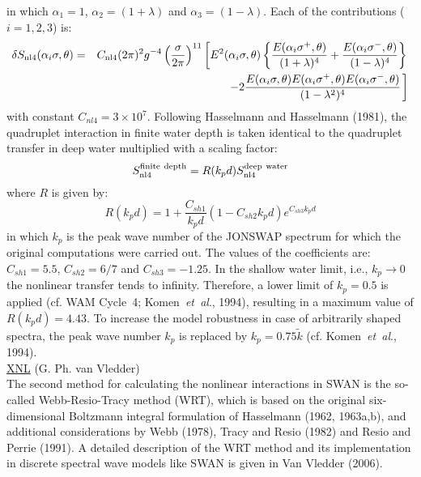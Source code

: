 \documentclass[12pt]{book}
\begin{document}
in which $\alpha_1 =1$, $\alpha_2 = (1+\lambda)$ and $\alpha_3 = (1-\lambda)$. Each of the contributions ($i=1,2,3$) is:
\begin{eqnarray}
  \delta S_{\rm nl4}(\alpha_i \sigma,\theta) &=& C_{\rm nl4} (2\pi)^2 g^{-4} \left(\frac{\sigma}{2\pi} \right)^{11}
  \left[E^2 (\alpha_i\sigma,\theta) \left\{\frac{E(\alpha_i\sigma^+,\theta)}{(1+\lambda)^4} +
  \frac{E(\alpha_i\sigma^{-},\theta)}{(1-\lambda)^4} \right\} \right. \nonumber \\
  &&\left. \left. -2\frac{E(\alpha_i\sigma,\theta) E(\alpha_i\sigma^+,\theta) E(\alpha_i\sigma^-,\theta)}{(1-\lambda^2)^4}
    \right. \right]
  \label{eq3-30}
\end{eqnarray}
with constant $C_{nl4} = 3 \times 10^7$. Following Hasselmann and Hasselmann (1981), the quadruplet interaction
in finite water depth is taken identical to the quadruplet transfer in deep water multiplied with a scaling
factor:
\begin{equation}
  S_{\rm nl4}^{\rm finite~depth} = R(k_pd)S_{\rm nl4}^{\rm deep~water}
  \label{eq3-31}
\end{equation}
where $R$ is given by:
\begin{equation}
  R(k_pd) = 1 + \frac{C_{sh1}}{k_pd} (1-C_{sh2}k_pd) e^{C_{sh3}k_pd}
  \label{eq3-32}
\end{equation}
in which $k_p$ is the peak wave number of the JONSWAP spectrum for which the original computations were
carried out. The values of the coefficients are: $C _{sh1}= 5.5$, $C _{sh2} = 6/7$ and $C _{sh3} = -1.25$.
In the shallow water limit, i.e., $k_p \rightarrow 0$ the nonlinear transfer tends to infinity. Therefore,
a lower limit of $k_p = 0.5$ is applied (cf. WAM Cycle~4; Komen~{\it et~al}., 1994), resulting in a maximum value
of $R(k_pd)=4.43$. To increase the model robustness in case of arbitrarily shaped spectra, the peak wave number
$k_p$ is replaced by $k_p = 0.75 \tilde{k}$ (cf. Komen~{\it et~al}., 1994).
\\[2ex]
\noindent
\underline{XNL} \hfill (G. Ph. van Vledder)
\\[2ex]
The second method for calculating the nonlinear interactions in SWAN
is the so-called Webb-Resio-Tracy method (WRT), which is based on the
original six-dimensional Boltzmann integral formulation of
Hasselmann (1962, 1963a,b), and additional considerations by
Webb (1978), Tracy and Resio (1982) and Resio and Perrie (1991).
A detailed description of the WRT method and its implementation in
discrete spectral wave models like SWAN is given in Van Vledder (2006).
\end{document}

